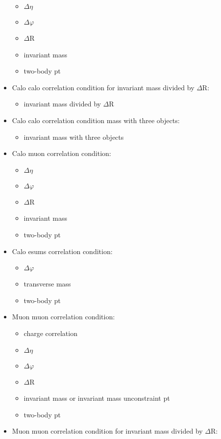 \begin{itemize}
\begin{itemize}
\item $\Delta\eta$
\item $\Delta\varphi$
\item $\Delta$R
\item invariant mass
\item two-body pt
\end{itemize}
\item Calo calo correlation condition for invariant mass divided by $\Delta$R:
\begin{itemize}
\item invariant mass divided by $\Delta$R
\end{itemize}
\item Calo calo correlation condition mass with three objects:
\begin{itemize}
\item invariant mass with three objects
\end{itemize}
\item Calo muon correlation condition:
\begin{itemize}
\item $\Delta\eta$
\item $\Delta\varphi$
\item $\Delta$R
\item invariant mass
\item two-body pt
\end{itemize}
\item Calo esums correlation condition:
\begin{itemize}
\item $\Delta\varphi$
\item transverse mass
\item two-body pt
\end{itemize}
\item Muon muon correlation condition:
\begin{itemize}
\item charge correlation
\item $\Delta\eta$
\item $\Delta\varphi$
\item $\Delta$R
\item invariant mass or invariant mass unconstraint pt
\item two-body pt
\end{itemize}
\item Muon muon correlation condition for invariant mass divided by $\Delta$R:
\begin{itemize}

\end{itemize}
\end{itemize}
